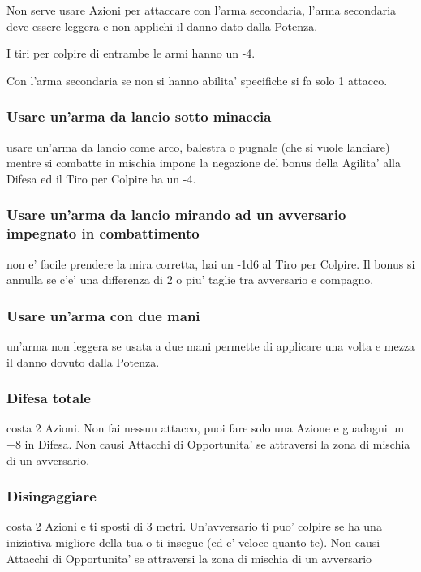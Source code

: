 \documentclass[a4paper,11pt,twoside,openany]{book}
\begin{document}
Non serve usare Azioni per attaccare con l'arma secondaria, l'arma secondaria deve essere leggera e non applichi il danno dato dalla Potenza.

I tiri per colpire di entrambe le armi hanno un -4.

Con l'arma secondaria se non si hanno abilita' specifiche si fa solo 1 attacco.

\subsubsection{Usare un'arma da lancio sotto minaccia} usare un'arma da lancio come arco, balestra o pugnale (che si vuole lanciare) mentre si combatte in mischia impone la negazione del bonus della Agilita' alla Difesa ed il Tiro per Colpire ha un -4.

\subsubsection{Usare un'arma da lancio mirando ad un avversario impegnato
in combattimento} non e' facile prendere la mira corretta, hai un -1d6 al Tiro per Colpire. Il bonus si annulla se c'e' una differenza di 2 o piu' taglie tra avversario e compagno.

\subsubsection{Usare un'arma con due mani} un'arma non leggera se usata a due mani permette di applicare una volta e mezza il danno dovuto dalla Potenza.

\subsubsection{Difesa totale} costa 2 Azioni. Non fai nessun attacco, puoi fare solo una Azione e guadagni un +8 in Difesa. Non causi Attacchi di Opportunita' se attraversi la zona di mischia di un avversario.

\subsubsection{Disingaggiare} costa 2 Azioni e ti sposti di 3 metri. Un'avversario ti puo' colpire se ha una iniziativa migliore della tua o ti insegue (ed e' veloce quanto te). Non causi Attacchi di Opportunita' se attraversi la zona di mischia di un avversario
\end{document}
